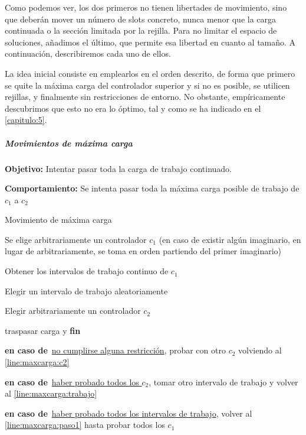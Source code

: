 Como podemos ver, los dos primeros no tienen libertades de movimiento, sino que deberán mover un número de slots concreto, nunca menor que la carga continuada o la sección limitada por la rejilla. Para no limitar el espacio de soluciones, añadimos el último, que permite esa libertad en cuanto al tamaño. A continuación, describiremos cada uno de ellos.

La idea inicial consiste en emplearlos en el orden descrito, de forma que primero se quite la máxima carga del controlador superior y si no es posible, se utilicen rejillas, y finalmente sin restricciones de entorno. No obstante, empíricamente descubrimos que esto no era lo óptimo, tal y como se ha indicado en el \autoref{capitulo:5}.

\subparagraph{Movimientos de máxima carga}
\label{entorno:movMaxCarga}

\textbf{Objetivo:} Intentar pasar toda la carga de trabajo continuado.

\textbf{Comportamiento:} Se intenta pasar toda la máxima carga posible de trabajo de $c_1$ a $c_2$

\SetAlgoNoLine
\LinesNumbered
\SetAlgoNoEnd
\DontPrintSemicolon
\begin{algorithm}[h]
    \label{algoritmo:movMaxCarga}
    
   	\caption{Movimiento de máxima carga}
    	
    \SetAlgoNoEnd
    Se elige arbitrariamente un controlador $c_1$ (en caso de existir algún imaginario, en lugar de arbitrariamente, se toma en orden partiendo \newline del primer imaginario) \label{line:maxcarga:paso1}\;
    \algovspace

    Obtener los intervalos de trabajo continuo de $c_1$\;
    \algovspace

    Elegir un intervalo de trabajo aleatoriamente \label{line:maxcarga:trabajo}\;
    \algovspace

    Elegir arbitrariamente un controlador $c_2$ \label{line:maxcarga:c2}\;
    \algovspace

    {traspasar carga y \textbf{fin}}
    \algovspace

    \textbf{en caso de\,} \underline{no cumplirse alguna restricción}, probar con otro $c_2$ volviendo al \autoref{line:maxcarga:c2}\;
    \algovspace

    \textbf{en caso de\,} \underline{haber probado todos los $c_2$}, tomar otro intervalo de trabajo y volver al \autoref{line:maxcarga:trabajo}\;
    \algovspace

    \textbf{en caso de\,} \underline{haber probado todos los intervalos de trabajo}, volver al \autoref{line:maxcarga:paso1} hasta probar todos los $c_1$\;
    \algovspace
\end{algorithm}


